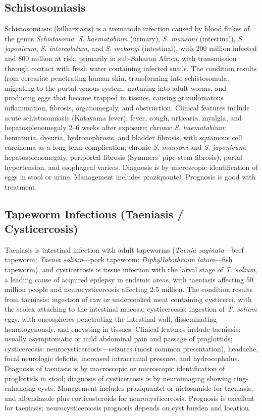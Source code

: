 \subsection{Schistosomiasis}
\label{sec:Schistosomiasis}
Schistosomiasis (bilharziasis) is a trematode infection caused by blood flukes of the genus \textit{Schistosoma}: \textit{S. haematobium} (urinary), \textit{S. mansoni} (intestinal), \textit{S. japonicum}, \textit{S. intercalatum}, and \textit{S. mekongi} (intestinal), with 200 million infected and 800 million at risk, primarily in sub-Saharan Africa, with transmission through contact with fresh water containing infected snails. The condition results from cercariae penetrating human skin, transforming into schistosomula, migrating to the portal venous system, maturing into adult worms, and producing eggs that become trapped in tissues, causing granulomatous inflammation, fibrosis, organomegaly, and obstruction. Clinical features include acute schistosomiasis (Katayama fever): fever, cough, urticaria, myalgia, and hepatosplenomegaly 2--6 weeks after exposure; chronic \textit{S. haematobium}: hematuria, dysuria, hydronephrosis, and bladder fibrosis, with squamous cell carcinoma as a long-term complication; chronic \textit{S. mansoni} and \textit{S. japonicum}: hepatosplenomegaly, periportal fibrosis (Symmers' pipe-stem fibrosis), portal hypertension, and esophageal varices. Diagnosis is by microscopic identification of eggs in stool or urine. Management includes praziquantel. Prognosis is good with treatment.

\subsection{Tapeworm Infections (Taeniasis / Cysticercosis)}
\label{sec:Tapeworm Infections}
Taeniasis is intestinal infection with adult tapeworms (\textit{Taenia saginata}---beef tapeworm; \textit{Taenia solium}---pork tapeworm; \textit{Diphyllobothrium latum}---fish tapeworm), and cysticercosis is tissue infection with the larval stage of \textit{T. solium}, a leading cause of acquired epilepsy in endemic areas, with taeniasis affecting 50 million people and neurocysticercosis affecting 2.5 million. The condition results from taeniasis: ingestion of raw or undercooked meat containing cysticerci, with the scolex attaching to the intestinal mucosa; cysticercosis: ingestion of \textit{T. solium} eggs, with oncospheres penetrating the intestinal wall, disseminating hematogenously, and encysting in tissues. Clinical features include taeniasis: usually asymptomatic or mild abdominal pain and passage of proglottids; cysticercosis: neurocysticercosis---seizures (most common presentation), headache, focal neurologic deficits, increased intracranial pressure, and hydrocephalus. Diagnosis of taeniasis is by macroscopic or microscopic identification of proglottids in stool; diagnosis of cysticercosis is by neuroimaging showing ring-enhancing cysts. Management includes praziquantel or niclosamide for taeniasis, and albendazole plus corticosteroids for neurocysticercosis. Prognosis is excellent for taeniasis; neurocysticercosis prognosis depends on cyst burden and location.


